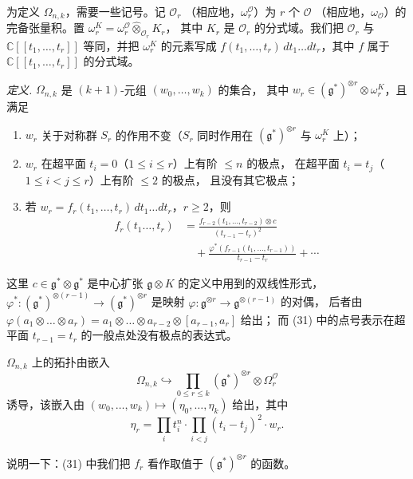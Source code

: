 为定义 $\Omega_{n,k}$，需要一些记号。记 $\mathcal{O}_r$
（相应地，$\omega^{\mathcal{O}}_r$）为 $r$ 个 $\mathcal{O}$
（相应地，$\omega_{\mathcal{O}}$）的完备张量积。置
$\omega^K_r=\omega^{\mathcal{O}}_r\widehat{\otimes}_{\mathcal{O}_r}K_r$，
其中 $K_r$ 是 $\mathcal{O}_r$ 的分式域。我们把 $\mathcal{O}_r$ 与
$\mathbb{C}[[t_1,\ldots,t_r]]$ 等同，并把 $\omega^K_r$ 的元素写成
$f(t_1,\ldots,t_r)\,dt_1\ldots dt_r$，其中 $f$ 属于
$\mathbb{C}[[t_1,\ldots,t_r]]$ 的分式域。

\emph{定义.} $\Omega_{n,k}$ 是 $(k+1)$-元组 $(w_0,\ldots,w_k)$ 的集合，
其中 $w_r\in(\mathfrak{g}^*)^{\otimes r}\otimes\omega^K_r$，且满足
\begin{enumerate}[label=\arabic*),leftmargin=2.4em]
\item $w_r$ 关于对称群 $S_r$ 的作用不变（$S_r$ 同时作用在
  $(\mathfrak{g}^*)^{\otimes r}$ 与 $\omega^K_r$ 上）；
\item $w_r$ 在超平面 $t_i=0$（$1\le i\le r$）上有阶 $\le n$ 的极点，
  在超平面 $t_i=t_j$（$1\le i<j\le r$）上有阶 $\le 2$ 的极点，
  且没有其它极点；
\item 若 $w_r=f_r(t_1,\ldots,t_r)\,dt_1\ldots dt_r$，$r\ge 2$，则
\begin{equation}\tag{31}
\begin{aligned}
  f_r(t_1\ldots,t_r)&=\frac{f_{r-2}(t_1,\ldots,t_{r-2})\otimes c}
    {(t_{r-1}-t_r)^2}\\
  &\quad+\frac{\varphi^*(f_{r-1}(t_1,\ldots,t_{r-1}))}{t_{r-1}-t_r}+\cdots
\end{aligned}
\end{equation}
\end{enumerate}
这里 $c\in\mathfrak{g}^*\otimes\mathfrak{g}^*$ 是中心扩张
$\mathfrak{g}\otimes K$ 的定义中用到的双线性形式，
$\varphi^*:(\mathfrak{g}^*)^{\otimes(r-1)}\to(\mathfrak{g}^*)^{\otimes r}$
是映射 $\varphi:\mathfrak{g}^{\otimes r}\to\mathfrak{g}^{\otimes(r-1)}$ 的对偶，
后者由
$\varphi(a_1\otimes\ldots\otimes a_r)
=a_1\otimes\ldots\otimes a_{r-2}\otimes[a_{r-1},a_r]$ 给出；
而 (31) 中的点号表示在超平面 $t_{r-1}=t_r$ 的一般点处没有极点的表达式。

$\Omega_{n,k}$ 上的拓扑由嵌入
\[
  \Omega_{n,k}\hookrightarrow\prod_{0\le r\le k}
  (\mathfrak{g}^*)^{\otimes r}\otimes\Omega^{\mathcal{O}}_r
\]
诱导，该嵌入由 $(w_0,\ldots,w_k)\mapsto(\eta_0,\ldots,\eta_k)$ 给出，其中
\[
  \eta_r=\prod_i t_i^n\cdot\prod_{i<j}(t_i-t_j)^2\cdot w_r.
\]


说明一下：(31) 中我们把 $f_r$ 看作取值于 $(\mathfrak{g}^*)^{\otimes r}$ 的函数。

